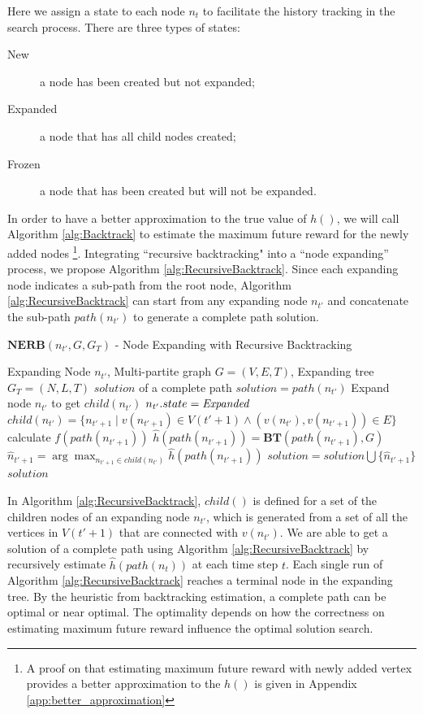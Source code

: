 Here we assign a state to each node $ n_{t} $ to facilitate the history tracking in the search process. 
There are three types of states:
\begin{description}
\item [New] a node has been created but not expanded;
\item [Expanded] a node that has all child nodes created;
\item [Frozen] a node that has been created but will not be expanded.
\end{description}

In order to have a better approximation to the true value of $ h() $, we will call Algorithm \ref{alg:Backtrack} to estimate the maximum future reward for the newly added nodes
\footnote{A proof on that estimating maximum future reward with newly added vertex provides a better approximation to the $ h() $ is given in Appendix \ref{app:better_approximation} }. 
Integrating ``recursive backtracking" into a ``node expanding'' process, we propose Algorithm \ref{alg:RecursiveBacktrack}.
Since each expanding node indicates a sub-path from the root node, Algorithm \ref{alg:RecursiveBacktrack} can start from any expanding node $ n_{t'} $ and concatenate the sub-path $ path(n_{t'}) $ to generate a complete path solution.

\begin{algorithm}
\caption{ $ \mathbf{NERB}( n_{t'}, G, G_{T} ) $ - Node Expanding with Recursive Backtracking }
\label{alg:RecursiveBacktrack}
\begin{algorithmic}[1]
\REQUIRE 
Expanding Node $ n_{t'} $, Multi-partite graph $ G = (V, E, T) $, Expanding tree $ G_{T} = (N, L, T) $
\ENSURE $ solution $ of a complete path
\STATE $ solution = path(n_{t'}) $ 
\STATE  Expand node $ n_{t'} $ to get $ child(n_{t'}) $
\STATE  $ n_{t'}.state = \mbox{\emph{Expanded}} $
\STATE  $ child(n_{t'}) = \{ n_{t'+1} \mid v(n_{t'+1}) \in V(t'+1) \land (v(n_{t'}), v(n_{t'+1})) \in E  \} $
\STATE  calculate $ f(path(n_{t'+1})) $
\STATE  $ \hat{h}(path(n_{t'+1})) = \mathbf{BT}( path(n_{t'+1}) , G ) $
\ENDFOR
\STATE  $ \hat{n}_{t'+1} = \arg \max_{n_{t'+1} \in child(n_{t'})} \hat{h}(path(n_{t'+1})) $
\STATE  $ solution = solution \bigcup \{ \hat{n}_{t'+1} \} $
\ENDFOR 
\RETURN $ solution $
\end{algorithmic}
\end{algorithm}

In Algorithm \ref{alg:RecursiveBacktrack}, $ child() $ is defined for a set of the children nodes of an expanding node $ n_{t'} $, which is generated from a set of all the vertices in $ V(t'+1) $ that are connected with $ v(n_{t'}) $.
We are able to get a solution of a complete path using Algorithm \ref{alg:RecursiveBacktrack} by recursively estimate $ \hat{h}(path(n_{t})) $ at each time step $ t $.
Each single run of Algorithm \ref{alg:RecursiveBacktrack} reaches a terminal node in the expanding tree.
By the heuristic from backtracking estimation, a complete path can be optimal or near optimal.
The optimality depends on how the correctness on estimating maximum future reward influence the optimal solution search.

